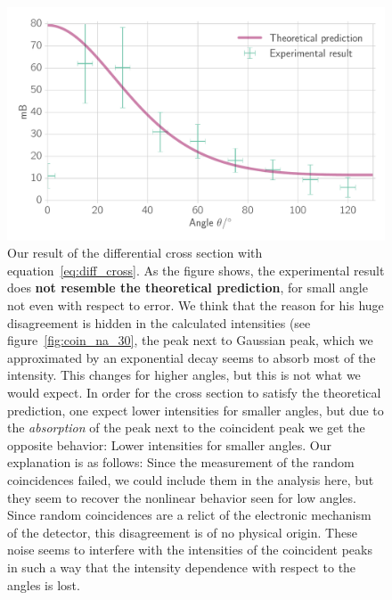 \begin{figure}[htpb]
    \centering
    \includegraphics[width=0.9\linewidth]{./analysis/figures/na_cross_section}
    \caption{Our result of the differential cross section with equation~\eqref{eq:diff_cross}. As the figure shows, the
    experimental result does \textbf{not resemble the theoretical prediction}, for small angle not even with respect to error. 
We think 
that the reason for his huge disagreement is hidden in the calculated intensities (see figure~\ref{fig:coin_na_30}, the
peak next to Gaussian peak, which we approximated by an exponential decay seems to absorb most of the intensity. This changes
for higher angles, but this is not what we would expect. In order for the cross section to satisfy the theoretical prediction,
one expect lower intensities for smaller angles, but due to the \emph{absorption} of the peak next to the coincident peak
we get the opposite behavior: Lower intensities for smaller angles. Our explanation is as follows: Since the measurement
of the random coincidences failed, we could include them in the analysis here, but they seem to recover the nonlinear behavior
seen for low angles. Since random coincidences are a relict of the electronic mechanism of the detector, this disagreement
is of no physical origin. These noise seems to interfere with the intensities of the coincident peaks in such a way that the
intensity dependence with respect to the angles is lost.}
\label{fig:na_cross_section}
\end{figure}
\newpage
